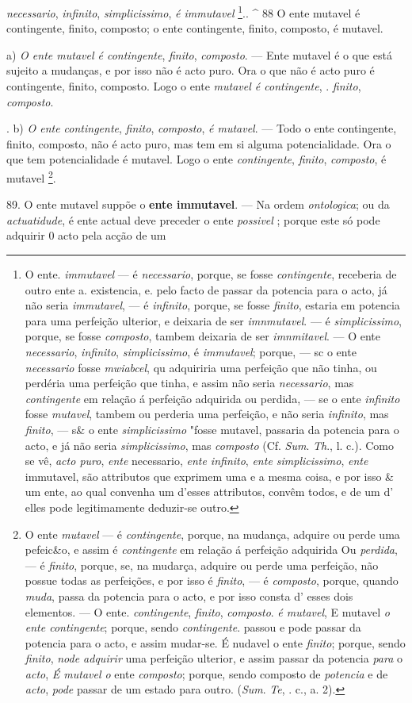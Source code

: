  \emph{necessario}, \emph{infinito}, \emph{simplicissimo}, \emph{é immutavel} \footnote{O ente. \emph{immutavel} --- é \emph{necessario}, porque, se fosse \emph{contingente}, receberia de outro ente a. existencia, e. pelo facto de passar da potencia para o acto, já não seria \emph{immutavel}, --- é \emph{infinito}, porque, se fosse \emph{finito}, estaria em potencia para uma perfeição ulterior, e deixaria de ser \emph{imnmutavel}. --- é \emph{simplicissimo}, porque, se fosse \emph{composto}, tambem deixaria de ser \emph{imnmitavel}. --- O ente \emph{necessario}, \emph{infinito}, \emph{simplicissimo}, é \emph{immutavel}; porque, --- sc o ente \emph{necessario} fosse \emph{mwiabcel}, qu adquiriria uma perfeição que não tinha, ou perdéria uma perfeição que tinha, e assim não seria \emph{necessario}, mas \emph{contingente} em relação á perfeição adquirida ou perdida, --- se o ente \emph{infinito} fosse \emph{mutavel}, tambem ou perderia uma perfeição, e não seria \emph{infinito}, mas \emph{finito}, --- s\& o ente \emph{simplicissimo} "fosse mutavel, passaria da potencia para o acto, e já não seria \emph{simplicissimo}, mas \emph{composto} (Cf. \emph{Sum}. \emph{Th}., l. c.). Como se vê, \emph{acto puro}, \emph{ente} necessario, \emph{ente infinito}, \emph{ente simplicissimo}, \emph{ente} immutavel, são attributos que exprimem uma e a mesma coisa, e por isso \& um ente, ao qual convenha um d'esses attributos, convêm todos, e de um d' elles pode legitimamente deduzir-se outro.}.. \textasciicircum{} 88 O ente mutavel é contingente, finito, composto; o ente contingente, finito, composto, é mutavel.

a) \emph{O ente mutavel é contingente}, \emph{finito}, \emph{composto}. --- Ente mutavel é o que está sujeito a mudanças, e por isso não é acto puro. Ora o que não é acto puro é contingente, finito, composto. Logo o ente \emph{mutavel é contingente}, . \emph{finito}, \emph{composto}.

. b) \emph{O ente contingente}, \emph{finito}, \emph{composto}, \emph{é mutavel}. --- Todo o ente contingente, finito, composto, não é acto puro, mas tem em si alguma potencialidade. Ora o que tem potencialidade é mutavel. Logo o ente \emph{contingente}, \emph{finito}, \emph{composto}, é mutavel \footnote{O ente \emph{mutavel} --- é \emph{contingente}, porque, na mudança, adquire ou perde uma pefeic\&o, e assim é \emph{contingente} em relação á perfeição adquirida Ou \emph{perdida}, --- é \emph{finito}, porque, se, na mudarça, adquire ou perde uma perfeição, não possue todas as perfeições, e por isso é \emph{finito}, --- é \emph{composto}, porque, quando \emph{muda}, passa da potencia para o acto, e por isso consta d' esses dois elementos. --- O ente. \emph{contingente}, \emph{finito}, \emph{composto}. \emph{é mutavel}, E mutavel \emph{o ente contingente}; porque, sendo \emph{contingente}. passou e pode passar da potencia para o acto, e assim mudar-se. É nudavel o ente \emph{finito}; porque, sendo \emph{finito}, \emph{node adquirir} uma perfeição ulterior, e assim passar da potencia \emph{para} o \emph{acto}, \emph{É mutavel o} ente \emph{composto}; porque, sendo composto de \emph{potencia} e de \emph{acto}, \emph{pode} passar de um estado para outro. (\emph{Sum}. \emph{Te}, \textbar{}. c., a. 2).}.

89. O ente mutavel suppõe o \textbf{ente immutavel}. --- Na ordem \emph{ontologica}; ou da \emph{actuatidude}, é ente actual deve preceder o ente \emph{possivel} ; porque este só pode adquirir 0 acto pela acção de um 